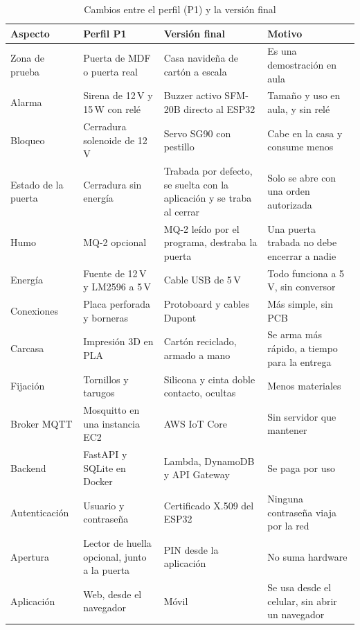 \documentclass[manuscript,screen,nonacm]{acmart}
\begin{document}
\begin{table}[htbp]
\centering
\caption{Cambios entre el perfil (P1) y la versión final}
\label{tab:cambios}
\footnotesize
\renewcommand{\arraystretch}{1.2}
\begin{tabular}{@{}L{2.1cm}L{3.4cm}L{3.6cm}L{3.6cm}@{}}
\toprule
\textbf{Aspecto} & \textbf{Perfil P1} & \textbf{Versión final} & \textbf{Motivo} \\
\midrule
Zona de prueba & Puerta de MDF o puerta real & Casa navideña de cartón a escala & Es una demostración en aula \\
Alarma & Sirena de 12\,V y 15\,W con relé & Buzzer activo SFM-20B directo al ESP32 & Tamaño y uso en aula, y sin relé \\
Bloqueo & Cerradura solenoide de 12\,V & Servo SG90 con pestillo & Cabe en la casa y consume menos \\
Estado de la puerta & Cerradura sin energía & Trabada por defecto, se suelta con la aplicación y se traba al cerrar & Solo se abre con una orden autorizada \\
Humo & MQ-2 opcional & MQ-2 leído por el programa, destraba la puerta & Una puerta trabada no debe encerrar a nadie \\
Energía & Fuente de 12\,V y LM2596 a 5\,V & Cable USB de 5\,V & Todo funciona a 5\,V, sin conversor \\
Conexiones & Placa perforada y borneras & Protoboard y cables Dupont & Más simple, sin PCB \\
Carcasa & Impresión 3D en PLA & Cartón reciclado, armado a mano & Se arma más rápido, a tiempo para la entrega \\
Fijación & Tornillos y tarugos & Silicona y cinta doble contacto, ocultas & Menos materiales \\
Broker MQTT & Mosquitto en una instancia EC2 & AWS IoT Core & Sin servidor que mantener \\
Backend & FastAPI y SQLite en Docker & Lambda, DynamoDB y API Gateway & Se paga por uso \\
Autenticación & Usuario y contraseña & Certificado X.509 del ESP32 & Ninguna contraseña viaja por la red \\
Apertura & Lector de huella opcional, junto a la puerta & PIN desde la aplicación & No suma hardware \\
Aplicación & Web, desde el navegador & Móvil & Se usa desde el celular, sin abrir un navegador \\
\bottomrule
\end{tabular}
\end{table}
\end{document}
